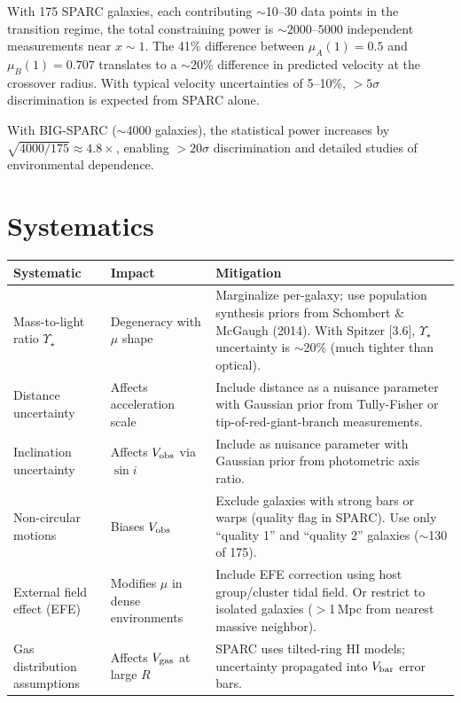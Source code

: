 \documentclass[11pt]{article}
\begin{document}
With 175 SPARC galaxies, each contributing $\sim$10--30 data points
in the transition regime, the total constraining power is
$\sim 2000$--$5000$ independent measurements near $x \sim 1$.
The 41\% difference between $\mu_A(1) = 0.5$ and $\mu_B(1) = 0.707$
translates to a $\sim$20\% difference in predicted velocity at the
crossover radius. With typical velocity uncertainties of 5--10\%,
$>5\sigma$ discrimination is expected from SPARC alone.

With BIG-SPARC ($\sim$4000 galaxies), the statistical power increases
by $\sqrt{4000/175} \approx 4.8\times$, enabling $>20\sigma$
discrimination and detailed studies of environmental dependence.

\section{Systematics}

\begin{center}
\renewcommand{\arraystretch}{1.25}
\begin{tabular}{@{}p{4cm}p{3cm}p{6cm}@{}}
\toprule
\textbf{Systematic} & \textbf{Impact} & \textbf{Mitigation} \\
\midrule
Mass-to-light ratio $\Upsilon_\star$ & Degeneracy with $\mu$ shape &
  Marginalize per-galaxy; use population synthesis priors from
  Schombert \& McGaugh (2014). With Spitzer [3.6], $\Upsilon_\star$
  uncertainty is $\sim$20\% (much tighter than optical). \\
\midrule
Distance uncertainty & Affects acceleration scale &
  Include distance as a nuisance parameter with Gaussian prior
  from Tully-Fisher or tip-of-red-giant-branch measurements. \\
\midrule
Inclination uncertainty & Affects $V_{\rm obs}$ via $\sin i$ &
  Include as nuisance parameter with Gaussian prior from
  photometric axis ratio. \\
\midrule
Non-circular motions & Biases $V_{\rm obs}$ & Exclude galaxies
  with strong bars or warps (quality flag in SPARC). Use only
  ``quality 1'' and ``quality 2'' galaxies ($\sim$130 of 175). \\
\midrule
External field effect (EFE) & Modifies $\mu$ in dense environments &
  Include EFE correction using host group/cluster tidal field.
  Or restrict to isolated galaxies ($>$1\,Mpc from nearest
  massive neighbor). \\
\midrule
Gas distribution assumptions & Affects $V_{\rm gas}$ at large $R$ &
  SPARC uses tilted-ring HI models; uncertainty propagated into
  $V_{\rm bar}$ error bars. \\
\bottomrule
\end{tabular}
\end{center}
\end{document}
